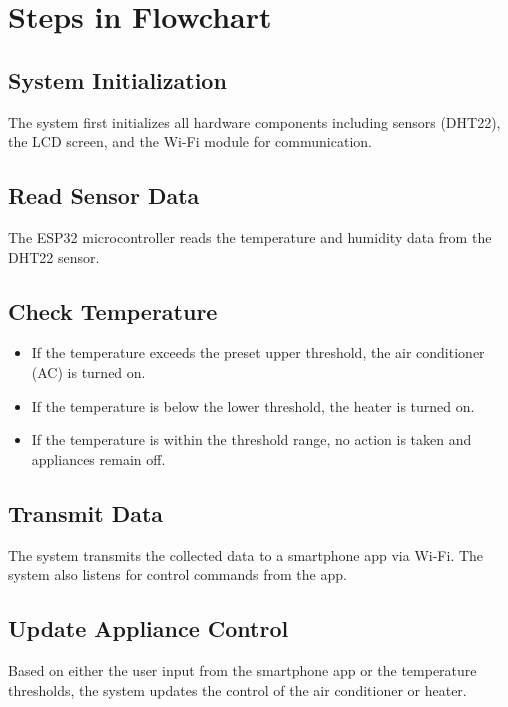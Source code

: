 \documentclass[a4paper,12pt]{article}
\begin{document}

\maketitle

\section*{Steps in Flowchart}

\subsection*{System Initialization}
The system first initializes all hardware components including sensors (DHT22), the LCD screen, and the Wi-Fi module for communication.

\subsection*{Read Sensor Data}
The ESP32 microcontroller reads the temperature and humidity data from the DHT22 sensor.

\subsection*{Check Temperature}
\begin{itemize}
    \item If the temperature exceeds the preset upper threshold, the air conditioner (AC) is turned on.
    \item If the temperature is below the lower threshold, the heater is turned on.
    \item If the temperature is within the threshold range, no action is taken and appliances remain off.
\end{itemize}

\subsection*{Transmit Data}
The system transmits the collected data to a smartphone app via Wi-Fi. The system also listens for control commands from the app.

\subsection*{Update Appliance Control}
Based on either the user input from the smartphone app or the temperature thresholds, the system updates the control of the air conditioner or heater.
\end{document}
